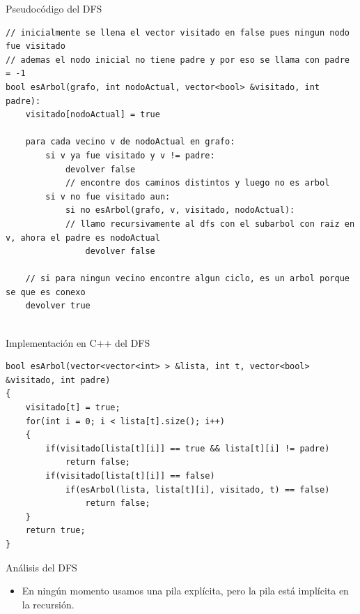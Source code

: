 \documentclass[compress]{beamer}
\begin{document}
\begin{frame}[fragile]{Pseudocódigo del DFS}
\begin{lstlisting}
// inicialmente se llena el vector visitado en false pues ningun nodo fue visitado
// ademas el nodo inicial no tiene padre y por eso se llama con padre = -1
bool esArbol(grafo, int nodoActual, vector<bool> &visitado, int padre):
    visitado[nodoActual] = true 

    para cada vecino v de nodoActual en grafo:
        si v ya fue visitado y v != padre:
            devolver false
            // encontre dos caminos distintos y luego no es arbol
        si v no fue visitado aun:
            si no esArbol(grafo, v, visitado, nodoActual): 
            // llamo recursivamente al dfs con el subarbol con raiz en v, ahora el padre es nodoActual
                devolver false
    
    // si para ningun vecino encontre algun ciclo, es un arbol porque se que es conexo
    devolver true
		
\end{lstlisting}
\end{frame}

\begin{frame}[fragile]{Implementación en C++ del DFS}
\begin{lstlisting}
bool esArbol(vector<vector<int> > &lista, int t, vector<bool> &visitado, int padre)
{
    visitado[t] = true;
    for(int i = 0; i < lista[t].size(); i++)
    {
        if(visitado[lista[t][i]] == true && lista[t][i] != padre)
            return false;
        if(visitado[lista[t][i]] == false)
            if(esArbol(lista, lista[t][i], visitado, t) == false)
                return false;
    }
    return true;
}
\end{lstlisting}
\end{frame}

\begin{frame}{Análisis del DFS}
\begin{itemize}
\item En ningún momento usamos una pila explícita, pero la pila está implícita en la recursión.
\pause
{}
\pause
{}
\pause
{}
\end{itemize}
\end{frame}
\end{document}
